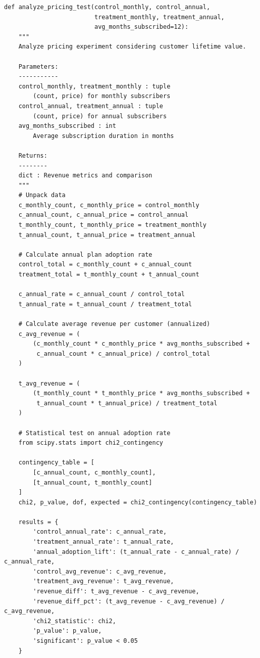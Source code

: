 \lstset{language=Python, caption=Revenue Analysis for Pricing Test}
\begin{lstlisting}
def analyze_pricing_test(control_monthly, control_annual,
                         treatment_monthly, treatment_annual,
                         avg_months_subscribed=12):
    """
    Analyze pricing experiment considering customer lifetime value.

    Parameters:
    -----------
    control_monthly, treatment_monthly : tuple
        (count, price) for monthly subscribers
    control_annual, treatment_annual : tuple
        (count, price) for annual subscribers
    avg_months_subscribed : int
        Average subscription duration in months

    Returns:
    --------
    dict : Revenue metrics and comparison
    """
    # Unpack data
    c_monthly_count, c_monthly_price = control_monthly
    c_annual_count, c_annual_price = control_annual
    t_monthly_count, t_monthly_price = treatment_monthly
    t_annual_count, t_annual_price = treatment_annual

    # Calculate annual plan adoption rate
    control_total = c_monthly_count + c_annual_count
    treatment_total = t_monthly_count + t_annual_count

    c_annual_rate = c_annual_count / control_total
    t_annual_rate = t_annual_count / treatment_total

    # Calculate average revenue per customer (annualized)
    c_avg_revenue = (
        (c_monthly_count * c_monthly_price * avg_months_subscribed +
         c_annual_count * c_annual_price) / control_total
    )

    t_avg_revenue = (
        (t_monthly_count * t_monthly_price * avg_months_subscribed +
         t_annual_count * t_annual_price) / treatment_total
    )

    # Statistical test on annual adoption rate
    from scipy.stats import chi2_contingency

    contingency_table = [
        [c_annual_count, c_monthly_count],
        [t_annual_count, t_monthly_count]
    ]
    chi2, p_value, dof, expected = chi2_contingency(contingency_table)

    results = {
        'control_annual_rate': c_annual_rate,
        'treatment_annual_rate': t_annual_rate,
        'annual_adoption_lift': (t_annual_rate - c_annual_rate) / c_annual_rate,
        'control_avg_revenue': c_avg_revenue,
        'treatment_avg_revenue': t_avg_revenue,
        'revenue_diff': t_avg_revenue - c_avg_revenue,
        'revenue_diff_pct': (t_avg_revenue - c_avg_revenue) / c_avg_revenue,
        'chi2_statistic': chi2,
        'p_value': p_value,
        'significant': p_value < 0.05
    }


\end{lstlisting}
